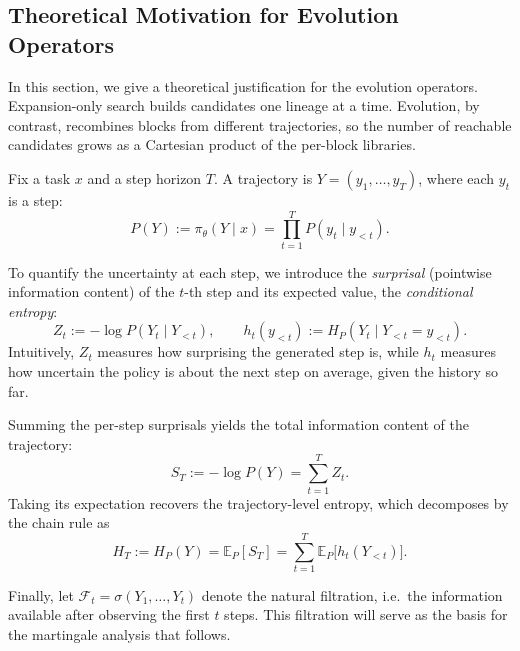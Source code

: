 \subsection{Theoretical Motivation for Evolution Operators}
\label{app:theory-mutation}

In this section, we give a theoretical justification for the evolution operators. Expansion-only search builds candidates one lineage at a time. Evolution, by contrast, recombines blocks from different trajectories, so the number of reachable candidates grows as a Cartesian product of the per-block libraries.

Fix a task $x$ and a step horizon $T$. A trajectory is $Y=(y_1,\ldots,y_T)$, where each $y_t$ is a step:
\begin{equation}
  P(Y) := \pi_\theta(Y\mid x)
  =\prod_{t=1}^{T}P(y_t\mid y_{<t}).
\end{equation}

To quantify the uncertainty at each step, we introduce the \emph{surprisal} (pointwise information content) of the $t$-th step and its expected value, the \emph{conditional entropy}:
\begin{equation}
  Z_t := -\log P(Y_t \mid Y_{<t}),
  \qquad
  h_t(y_{<t}) := H_P(Y_t \mid Y_{<t} = y_{<t}).
\end{equation}
Intuitively, $Z_t$ measures how surprising the generated step is, while $h_t$ measures how uncertain the policy is about the next step on average, given the history so far.

Summing the per-step surprisals yields the total information content of the trajectory:
\begin{equation}
  S_T := -\log P(Y) = \sum_{t=1}^{T} Z_t.
\end{equation}
Taking its expectation recovers the trajectory-level entropy, which decomposes by the chain rule as
\begin{equation}
  H_T := H_P(Y) = \mathbb{E}_P[S_T]
  = \sum_{t=1}^{T} \mathbb{E}_P\bigl[h_t(Y_{<t})\bigr].
\end{equation}

Finally, let $\mathcal{F}_t = \sigma(Y_1,\dots,Y_t)$ denote the natural filtration, i.e.\ the information available after observing the first $t$ steps. This filtration will serve as the basis for the martingale analysis that follows.



